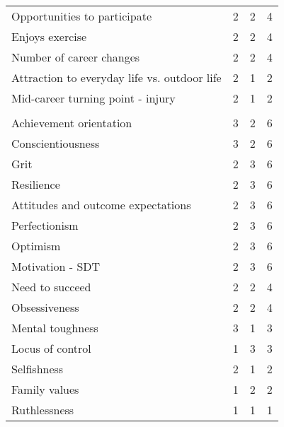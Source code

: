 \documentclass[
  12pt,
  a4paper,
]{book}
\begin{document}
\begin{table}
\begin{tabular}[t]{lrrr}
\hspace{1em}Opportunities to participate & 2 & 2 & 4\\
\hspace{1em}Enjoys exercise & 2 & 2 & 4\\
\hspace{1em}Number of career changes & 2 & 2 & 4\\
\hspace{1em}Attraction to everyday life vs. outdoor life & 2 & 1 & 2\\
\hspace{1em}Mid-career turning point - injury & 2 & 1 & 2\\
\addlinespace[0.3em]
\multicolumn{4}{l}{\textbf{Candidate personal characteristics}}\\
\hspace{1em}Achievement orientation & 3 & 2 & 6\\
\hspace{1em}Conscientiousness & 3 & 2 & 6\\
\hspace{1em}Grit & 2 & 3 & 6\\
\hspace{1em}Resilience & 2 & 3 & 6\\
\hspace{1em}Attitudes and outcome expectations & 2 & 3 & 6\\
\hspace{1em}Perfectionism & 2 & 3 & 6\\
\hspace{1em}Optimism & 2 & 3 & 6\\
\hspace{1em}Motivation - SDT & 2 & 3 & 6\\
\hspace{1em}Need to succeed & 2 & 2 & 4\\
\hspace{1em}Obsessiveness & 2 & 2 & 4\\
\hspace{1em}Mental toughness & 3 & 1 & 3\\
\hspace{1em}Locus of control & 1 & 3 & 3\\
\hspace{1em}Selfishness & 2 & 1 & 2\\
\hspace{1em}Family values & 1 & 2 & 2\\
\hspace{1em}Ruthlessness & 1 & 1 & 1\\

\end{tabular}
\end{table}
\end{document}

